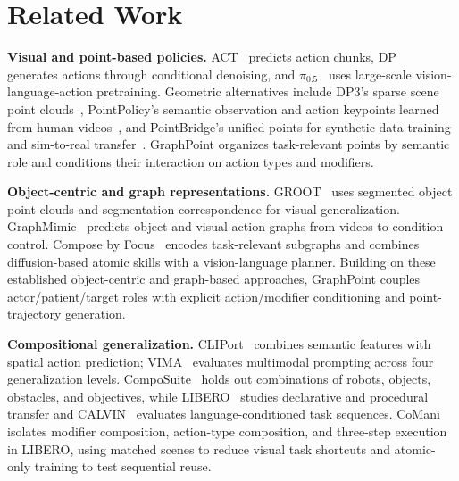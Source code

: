 \section{Related Work}

\textbf{Visual and point-based policies.}
ACT~\cite{zhao2023act} predicts action chunks, DP~\cite{chi2023dp} generates actions through conditional denoising, and $\pi_{0.5}$~\cite{physicalintelligence2025pi05} uses large-scale vision-language-action pretraining.
Geometric alternatives include DP3's sparse scene point clouds~\cite{ze2024dp3}, PointPolicy's semantic observation and action keypoints learned from human videos~\cite{haldar2025pp}, and PointBridge's unified points for synthetic-data training and sim-to-real transfer~\cite{haldar2026pb}.
GraphPoint organizes task-relevant points by semantic role and conditions their interaction on action types and modifiers.

\textbf{Object-centric and graph representations.}
GROOT~\cite{zhu2023groot} uses segmented object point clouds and segmentation correspondence for visual generalization.
GraphMimic~\cite{chen2025graphmimic} predicts object and visual-action graphs from videos to condition control.
Compose by Focus~\cite{qi2026compose} encodes task-relevant subgraphs and combines diffusion-based atomic skills with a vision-language planner.
Building on these established object-centric and graph-based approaches, GraphPoint couples actor/patient/target roles with explicit action/modifier conditioning and point-trajectory generation.

\textbf{Compositional generalization.}
CLIPort~\cite{shridhar2022cliport} combines semantic features with spatial action prediction; VIMA~\cite{jiang2023vima} evaluates multimodal prompting across four generalization levels.
CompoSuite~\cite{mendez2022composuite} holds out combinations of robots, objects, obstacles, and objectives, while LIBERO~\cite{liu2023libero} studies declarative and procedural transfer and CALVIN~\cite{mees2022calvin} evaluates language-conditioned task sequences.
CoMani isolates modifier composition, action-type composition, and three-step execution in LIBERO, using matched scenes to reduce visual task shortcuts and atomic-only training to test sequential reuse.
